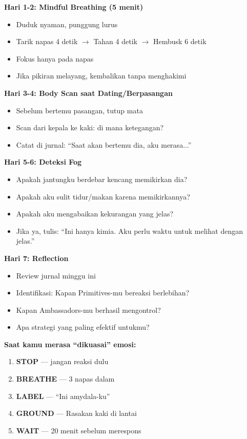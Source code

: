 \begin{exercisebox}

\textbf{Hari 1-2: Mindful Breathing (5 menit)}
\begin{itemize}
    \item Duduk nyaman, punggung lurus
    \item Tarik napas 4 detik $\rightarrow$ Tahan 4 detik $\rightarrow$ Hembusk 6 detik
    \item Fokus hanya pada napas
    \item Jika pikiran melayang, kembalikan tanpa menghakimi
\end{itemize}

\textbf{Hari 3-4: Body Scan saat Dating/Berpasangan}
\begin{itemize}
    \item Sebelum bertemu pasangan, tutup mata
    \item Scan dari kepala ke kaki: di mana ketegangan?
    \item Catat di jurnal: ``Saat akan bertemu dia, aku merasa...''
\end{itemize}

\textbf{Hari 5-6: Deteksi Fog}
\begin{itemize}
    \item Apakah jantungku berdebar kencang memikirkan dia?
    \item Apakah aku sulit tidur/makan karena memikirkannya?
    \item Apakah aku mengabaikan kekurangan yang jelas?
    \item Jika ya, tulis: ``Ini hanya kimia. Aku perlu waktu untuk melihat dengan jelas.''
\end{itemize}

\textbf{Hari 7: Reflection}
\begin{itemize}
    \item Review jurnal minggu ini
    \item Identifikasi: Kapan Primitives-mu bereaksi berlebihan?
    \item Kapan Ambassadors-mu berhasil mengontrol?
    \item Apa strategi yang paling efektif untukmu?
\end{itemize}
\end{exercisebox}

\begin{tipbox}
\textbf{Saat kamu merasa ``dikuasai'' emosi:}
\begin{enumerate}
    \item \textbf{STOP} --- jangan reaksi dulu
    \item \textbf{BREATHE} --- 3 napas dalam
    \item \textbf{LABEL} --- ``Ini amydala-ku''
    \item \textbf{GROUND} --- Rasakan kaki di lantai
    \item \textbf{WAIT} --- 20 menit sebelum merespons
\end{enumerate}
\end{tipbox}
